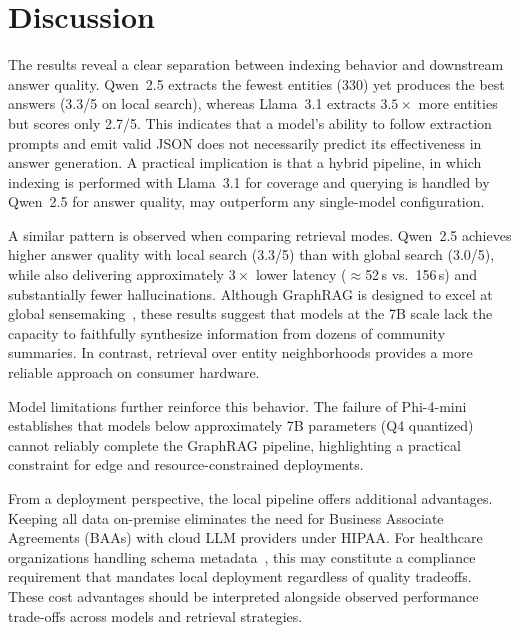 \documentclass{article}
\begin{document}
\section{Discussion}
\label{sec:discussion}

The results reveal a clear separation between indexing behavior and downstream answer quality. Qwen~2.5 extracts the fewest entities (330) yet produces the best answers (3.3/5 on local search), whereas Llama~3.1 extracts $3.5\times$ more entities but scores only 2.7/5. This indicates that a model's ability to follow extraction prompts and emit valid JSON does not necessarily predict its effectiveness in answer generation. A practical implication is that a hybrid pipeline, in which indexing is performed with Llama~3.1 for coverage and querying is handled by Qwen~2.5 for answer quality, may outperform any single-model configuration.

A similar pattern is observed when comparing retrieval modes. Qwen~2.5 achieves higher answer quality with local search (3.3/5) than with global search (3.0/5), while also delivering approximately $3\times$ lower latency ($\approx$52\,s vs.\ 156\,s) and substantially fewer hallucinations. Although GraphRAG is designed to excel at global sensemaking~\cite{edge2024local}, these results suggest that models at the 7B scale lack the capacity to faithfully synthesize information from dozens of community summaries. In contrast, retrieval over entity neighborhoods provides a more reliable approach on consumer hardware.

Model limitations further reinforce this behavior. The failure of Phi-4-mini establishes that models below approximately 7B parameters (Q4 quantized) cannot reliably complete the GraphRAG pipeline, highlighting a practical constraint for edge and resource-constrained deployments.

From a deployment perspective, the local pipeline offers additional advantages. Keeping all data on-premise eliminates the need for Business Associate Agreements (BAAs) with cloud LLM providers under HIPAA. For healthcare organizations handling schema metadata~\cite{singhal2023large}, this may constitute a compliance requirement that mandates local deployment regardless of quality tradeoffs. These cost advantages should be interpreted alongside observed performance trade-offs across models and retrieval strategies.
\end{document}
